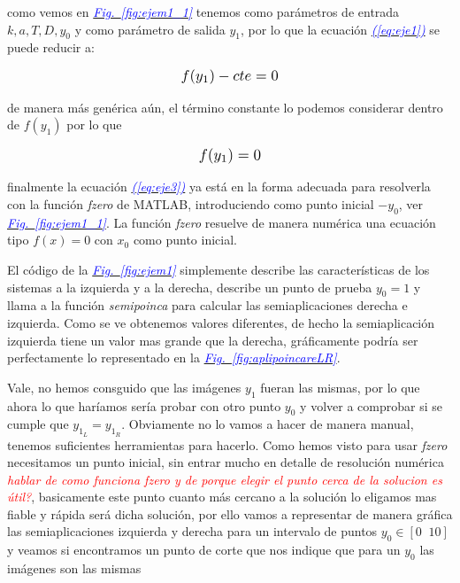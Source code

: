 \documentclass[12pt,a4paper]{report} %
\newcommand{\fref}[1]{\hyperref[#1]{\textcolor{blue}{\textit{Fig.~\ref*{#1}}}}}
\newcommand{\eref}[1]{\hyperref[#1]{\textcolor{blue}{\textit{(\ref*{#1})}}}}
\begin{document}
	\noindent como vemos en \fref{fig:ejem1_1} tenemos como parámetros de entrada $k,a,T,D,y_0$ y como parámetro de salida $y_1$, por lo que la ecuación \eref{eq:eje1} se puede reducir a:
	
	\begin{equation}
		\label{eq:eje2}
		\scalebox{1.2}{$\displaystyle
				f(y_1)-cte=0
			$}
	\end{equation}\smallskip
	
	\noindent de manera más genérica aún, el término constante lo podemos considerar dentro de $f(y_1)$ por lo que
	
		\begin{equation}
		\label{eq:eje3}
		\scalebox{1.2}{$\displaystyle
				f(y_1)=0
			$}
	\end{equation}\smallskip
	
	\noindent finalmente la ecuación \eref{eq:eje3} ya está en la forma adecuada para resolverla con la función \textit{fzero} de MATLAB, introduciendo como punto inicial $-y_0$, ver \fref{fig:ejem1_1}. La función \textit{fzero} resuelve de manera numérica una ecuación tipo $f(x)=0$ con $x_0$ como punto inicial.
	
	\vspace{0.5cm}\noindent El código de la \fref{fig:ejem1} simplemente describe las características de los sistemas a la izquierda y a la derecha, describe un punto de prueba $y_0=1$ y llama a la función \textit{semipoinca} para calcular las semiaplicaciones derecha e izquierda. Como se ve obtenemos valores diferentes, de hecho la semiaplicación izquierda tiene un valor mas grande que la derecha, gráficamente podría ser perfectamente lo representado en la \fref{fig:aplipoincareLR}.
	\newpage
	
	Vale, no hemos consguido que las imágenes $y_1$ fueran las mismas, por lo que ahora lo que haríamos sería probar con otro punto $y_0$ y volver a comprobar si se cumple que $y_{1_L}=y_{1_R}$. Obviamente no lo vamos a hacer de manera manual, tenemos suficientes herramientas para hacerlo. Como hemos visto para usar \textit{fzero} necesitamos un punto inicial, sin entrar mucho en detalle de resolución numérica \textit{\textcolor{red}{hablar de como funciona fzero y de porque elegir el punto cerca de la solucion es útil?}}, basicamente este punto cuanto más cercano a la solución lo eligamos mas fiable y rápida será dicha solución, por ello vamos a representar de manera gráfica las semiaplicaciones izquierda y derecha para un intervalo de puntos $y_0 \in [0\;\;10]$ y veamos si encontramos un punto de corte que nos indique que para un $y_0$ las imágenes son las mismas
	
\end{document}

